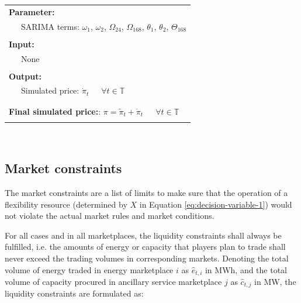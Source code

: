 \begin{table}[h!]
\begin{tabular}{L{0.95\textwidth}}
		\textbf{Parameter:} \\
		~~~SARIMA terms: $\omega_1$, $\omega_2$, $\Omega_{24}$, $\Omega_{168 }$, $\theta_1$, $\theta_2$, $\Theta_{168}$ \\
		\\
		\textbf{Input:} \\
		~~~None \\
		\\
		\textbf{Output:} \\
		~~~Simulated price: $\dot{\pi}_t$~~~$\forall t \in \mathbb{T}$ \\
		\\
		\hline
		\\
		\textbf{Final simulated price:}: $\pi =\tilde{\pi}_t + \dot{\pi}_t$~~~$\forall t \in \mathbb{T}$\\
		\\
		\hline
	\end{tabular}
\end{table}



~\newpage
\subsection{Market constraints}
\label{sec:market-constraints}
The market constraints are a list of limits to make sure that the operation of a flexibility resource (determined by $X$ in Equation \eqref{eq:decision-variable-1}) would not violate the actual market rules and market conditions.

For all cases and in all marketplaces, the liquidity constraints shall always be fulfilled, i.e. the amounts of energy or capacity that players plan to trade shall never exceed the trading volumes in corresponding markets. Denoting the total volume of energy traded in energy marketplace $i$ as $\hat{e}_{t,i}$ in MWh,  and the total volume of capacity procured in ancillary service marketplace $j$ as $\hat{c}_{t,j}$ in MW, the liquidity constraints are formulated as:

